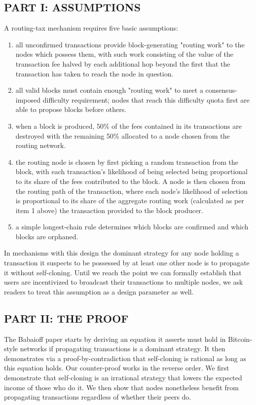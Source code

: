 \documentclass[oneside]{article}   	%
\begin{document}
\begin{multicols}{2}
\subsection*{PART I: ASSUMPTIONS}

A routing-tax mechanism requires five basic assumptions:

\begin{enumerate}
  \item all unconfirmed transactions provide block-generating "routing work" to the nodes which possess them, with such work consisting of the value of the transaction fee halved by each additional hop beyond the first that the transaction has taken to reach the node in question.
  \item all valid blocks must contain enough "routing work" to meet a consensus-imposed difficulty requirement; nodes that reach this difficulty quota first are able to propose blocks before others.
  \item when a block is produced, 50\% of the fees contained in its transactions are destroyed with the remaining 50\% allocated to a node chosen from the routing network.
  \item the routing node is chosen by first picking a random transaction from the block, with each transaction's likelihood of being selected being proportional to its share of the fees contributed to the block. A node is then chosen from the routing path of the transaction, where each node's likelihood of selection is proportional to its share of the aggregate routing work (calculated as per item 1 above) the transaction provided to the block producer.
  \item a simple longest-chain rule determines which blocks are confirmed and which blocks are orphaned.

\end{enumerate}
In mechanisms with this design the dominant strategy for any node holding a transaction it suspects to be possessed by at least one other node is to propagate it without self-cloning. Until we reach the point we can formally establish that users are incentivized to broadcast their transactions to multiple nodes, we ask readers to treat this assumption as a design parameter as well.

\subsection*{PART II: THE PROOF}

The Babaioff paper starts by deriving an equation it asserts must hold in Bitcoin-style networks if propagating transactions is a dominant strategy. It then demonstrates via a proof-by-contradiction that self-cloning is rational as long as this equation holds. Our counter-proof works in the reverse order. We first demonstrate that self-cloning is an irrational strategy that lowers the expected income of those who do it. We then show that nodes nonetheless benefit from propagating transactions regardless of whether their peers do.


\end{multicols}
\end{document}
